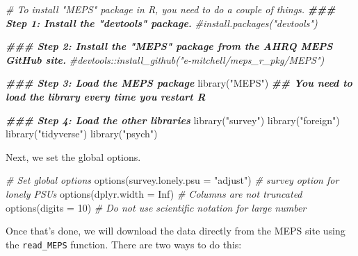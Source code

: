 \documentclass[
]{book}
\newenvironment{Shaded}{\begin{snugshade}}{\end{snugshade}}
\newcommand{\AttributeTok}[1]{\textcolor[rgb]{0.77,0.63,0.00}{#1}}
\newcommand{\CommentTok}[1]{\textcolor[rgb]{0.56,0.35,0.01}{\textit{#1}}}
\newcommand{\ConstantTok}[1]{\textcolor[rgb]{0.00,0.00,0.00}{#1}}
\newcommand{\DecValTok}[1]{\textcolor[rgb]{0.00,0.00,0.81}{#1}}
\newcommand{\DocumentationTok}[1]{\textcolor[rgb]{0.56,0.35,0.01}{\textbf{\textit{#1}}}}
\newcommand{\FunctionTok}[1]{\textcolor[rgb]{0.00,0.00,0.00}{#1}}
\newcommand{\NormalTok}[1]{#1}
\newcommand{\StringTok}[1]{\textcolor[rgb]{0.31,0.60,0.02}{#1}}
\begin{document}
\begin{Shaded}
\begin{Highlighting}[]
\CommentTok{\# To install "MEPS" package in R, you need to do a couple of things.}
\DocumentationTok{\#\#\# Step 1: Install the "devtools" package. }
\CommentTok{\#install.packages("devtools")}


\DocumentationTok{\#\#\# Step 2: Install the "MEPS" package from the AHRQ MEPS GitHub site. }
\CommentTok{\#devtools::install\_github("e{-}mitchell/meps\_r\_pkg/MEPS")}


\DocumentationTok{\#\#\# Step 3: Load the MEPS package}
\FunctionTok{library}\NormalTok{(}\StringTok{"MEPS"}\NormalTok{) }\DocumentationTok{\#\# You need to load the library every time you restart R}

\DocumentationTok{\#\#\# Step 4: Load the other libraries}
\FunctionTok{library}\NormalTok{(}\StringTok{"survey"}\NormalTok{)}
\FunctionTok{library}\NormalTok{(}\StringTok{"foreign"}\NormalTok{)}
\FunctionTok{library}\NormalTok{(}\StringTok{"tidyverse"}\NormalTok{)}
\FunctionTok{library}\NormalTok{(}\StringTok{"psych"}\NormalTok{)}
\end{Highlighting}
\end{Shaded}

Next, we set the global options.

\begin{Shaded}
\begin{Highlighting}[]
\CommentTok{\# Set global options}
\FunctionTok{options}\NormalTok{(}\AttributeTok{survey.lonely.psu =} \StringTok{"adjust"}\NormalTok{) }\CommentTok{\# survey option for lonely PSUs}
\FunctionTok{options}\NormalTok{(}\AttributeTok{dplyr.width =} \ConstantTok{Inf}\NormalTok{) }\CommentTok{\# Columns are not truncated}
\FunctionTok{options}\NormalTok{(}\AttributeTok{digits =} \DecValTok{10}\NormalTok{) }\CommentTok{\# Do not use scientific notation for large number}
\end{Highlighting}
\end{Shaded}

Once that's done, we will download the data directly from the MEPS site using the \texttt{read\_MEPS} function. There are two ways to do this:
\end{document}
